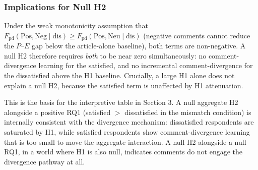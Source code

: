 \documentclass[
  12pt]{article}
\begin{document}
\subsubsection{Implications for Null H2}\label{implications-for-null-h2}

Under the weak monotonicity assumption that
\(F_\text{pd}(\text{Pos},\text{Neg} \mid \text{dis}) \geq F_\text{pd}(\text{Pos},\text{Neu} \mid \text{dis})\)
(negative comments cannot reduce the \(P\)--\(E\) gap below the
article-alone baseline), both terms are non-negative. A null H2
therefore requires \emph{both} to be near zero simultaneously: no
comment-divergence learning for the satisfied, and no incremental
comment-divergence for the dissatisfied above the H1 baseline.
Crucially, a large H1 alone does not explain a null H2, because the
satisfied term is unaffected by H1 attenuation.

This is the basis for the interpretive table in Section 3. A null
aggregate H2 alongside a positive RQ1 (satisfied \(>\) dissatisfied in
the mismatch condition) is internally consistent with the divergence
mechanism: dissatisfied respondents are saturated by H1, while satisfied
respondents show comment-divergence learning that is too small to move
the aggregate interaction. A null H2 alongside a null RQ1, in a world
where H1 is also null, indicates comments do not engage the divergence
pathway at all.




\end{document}
